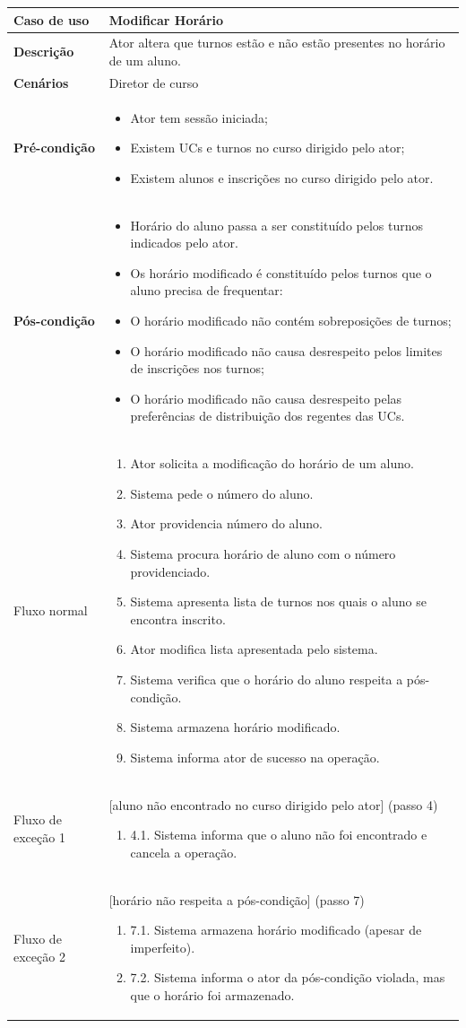 \documentclass[12pt, a4paper]{article}
\newenvironment{condition}{
    \begin{itemize}[wide=0pt]
        \vspace{-0.2cm}
}{
        \vspace{-0.5cm}
    \end{itemize}
}
\newcommand\flow[1]{
    Fluxo normal &
    \singlespacing
    \begin{enumerate}[wide=0pt]
        #1
        \vspace{-0.3cm}
    \end{enumerate} \\ \hline
}
\newcommand\otherflow[3]{
    #1 &
    #2
    \singlespacing
    \begin{enumerate}[wide=0pt]
        #3
        \vspace{-0.3cm}
    \end{enumerate} \\ \hline
}
\newenvironment{usecase}[5]{
    \begin{table}[H]
        \centering
        \begin{tabular}{|>{\centering\arraybackslash\bf}m{3cm}|m{13cm}|}
            \hline
            Caso de uso & \textbf{#1} \\

            \hline
            Descrição & #2 \\

            \hline
            Cenários & #3 \\

            \hline
            Pré-condição &
            \begin{condition}
                #4
            \end{condition} \\

            \hline
            Pós-condição &
            \begin{condition}
                #5
            \end{condition} \\

            \hline
}{
    \end{tabular}
\end{table}
}
\begin{document}
\begin{usecase}
    {Modificar Horário}
    {Ator altera que turnos estão e não estão presentes no horário de um aluno.}
    {Diretor de curso}
    {
        \item Ator tem sessão iniciada;
        \item Existem UCs e turnos no curso dirigido pelo ator;
        \item Existem alunos e inscrições no curso dirigido pelo ator.
    }
    {
        \item Horário do aluno passa a ser constituído pelos turnos indicados pelo ator.
        \item Os horário modificado é constituído pelos turnos que o aluno precisa de frequentar:
        \item O horário modificado não contém sobreposições de turnos;
        \item O horário modificado não causa desrespeito pelos limites de inscrições nos turnos;
        \item O horário modificado não causa desrespeito pelas preferências de distribuição dos
            regentes das UCs.
    }

    \flow{
        \item Ator solicita a modificação do horário de um aluno.
        \item Sistema pede o número do aluno.
        \item Ator providencia número do aluno.
        \item Sistema procura horário de aluno com o número providenciado.
        \item Sistema apresenta lista de turnos nos quais o aluno se encontra inscrito.
        \item Ator modifica lista apresentada pelo sistema.
        \item Sistema verifica que o horário do aluno respeita a pós-condição.
        \item Sistema armazena horário modificado.
        \item Sistema informa ator de sucesso na operação.
    }

    \otherflow{Fluxo de exceção 1}{[aluno não encontrado no curso dirigido pelo ator] (passo 4)}{
        \item[4.1.] Sistema informa que o aluno não foi encontrado e cancela a operação.
    }

    \otherflow{Fluxo de exceção 2}{[horário não respeita a pós-condição] (passo 7)}{
        \item[7.1.] Sistema armazena horário modificado (apesar de imperfeito).
        \item[7.2.] Sistema informa o ator da pós-condição violada, mas que o horário foi
            armazenado.
    }
\end{usecase}
\end{document}
